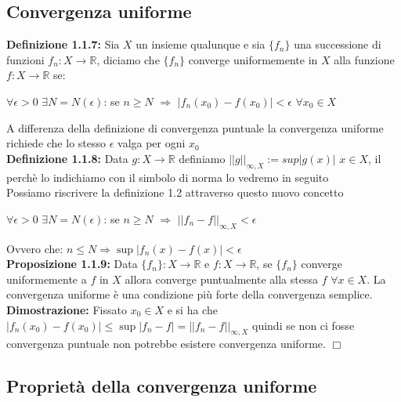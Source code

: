 \documentclass[a4paper,11pt,titlepage]{book}
\begin{document}
\subsection{Convergenza uniforme}

\textbf{Definizione 1.1.7:} Sia $X$ un insieme qualunque e sia $\{f_{n}\}$ una successione di funzioni $f_{n}:X\rightarrow\mathbb{R}$, diciamo che $\{f_{n}\}$ converge uniformemente in $X$ alla funzione $f:X\rightarrow\mathbb{R}$ se:

\begin{center}
$\forall{\epsilon{>0}}$ $\exists{N}=N(\epsilon)$: se $n\geq{N}$ $\Rightarrow$ $|f_{n}(x_{0})-f(x_{0})|<\epsilon$  $\forall{x_{0}}\in{X}$ \\
\end{center} 

A differenza della definizione di convergenza puntuale la convergenza uniforme richiede che lo stesso $\epsilon$ valga per ogni $x_0$ \\

\textbf{Definizione 1.1.8:} Data $g:X\rightarrow\mathbb{R}$ definiamo $||g||_{\infty,X}:=sup|g(x)|$ $x\in{X}$, il perchè lo indichiamo con il simbolo di norma lo vedremo in seguito\\ 

Possiamo riscrivere la definizione 1.2 attraverso questo nuovo concetto

\begin{center}
$\forall{\epsilon{>0}}$ $\exists{N}=N(\epsilon)$: se $n\geq{N}$ $\Rightarrow$ $||f_{n}-f||_{\infty,X}<\epsilon$\\
\end{center}

Ovvero che: $n\leq N \Rightarrow \sup|f_n(x)-f(x)|<\epsilon$\\

\textbf{Proposizione 1.1.9:} Data $\{f_{n}\}:X\rightarrow\mathbb{R}$ e $f:X\rightarrow\mathbb{R}$, se $\{f_{n}\}$ converge uniformemente a $f$ in $X$ allora converge puntualmente alla stessa $f$ $\forall x\in X$. La convergenza uniforme è una condizione più forte della convergenza semplice.\\

\textbf{Dimostrazione:} Fissato $x_0\in X$ e si ha che $|f_{n}(x_{0})-f(x_{0})|\leq \sup |f_{n}-f|=||f_{n}-f||_{\infty,X}$ quindi se non ci fosse convergenza puntuale non potrebbe esistere convergenza uniforme. $\Box$

\subsection{Proprietà della convergenza uniforme}
\end{document}
